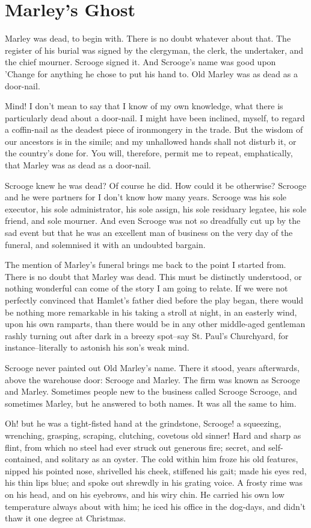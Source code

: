 \chapter{Marley's Ghost}

Marley was dead, to begin with. There is no doubt whatever about that.
The register of his burial was signed by the clergyman, the clerk, the
undertaker, and the chief mourner. Scrooge signed it. And Scrooge's name
was good upon 'Change for anything he chose to put his hand to. Old
Marley was as dead as a door-nail.

Mind! I don't mean to say that I know of my own knowledge, what there is
particularly dead about a door-nail. I might have been inclined, myself,
to regard a coffin-nail as the deadest piece of ironmongery in the
trade. But the wisdom of our ancestors is in the simile; and my
unhallowed hands shall not disturb it, or the country's done for. You
will, therefore, permit me to repeat, emphatically, that Marley was as
dead as a door-nail.

Scrooge knew he was dead? Of course he did. How could it be otherwise?
Scrooge and he were partners for I don't know how many years. Scrooge
was his sole executor, his sole administrator, his sole assign, his sole
residuary legatee, his sole friend, and sole mourner. And even Scrooge
was not so dreadfully cut up by the sad event but that he was an
excellent man of business on the very day of the funeral, and solemnised
it with an undoubted bargain.

The mention of Marley's funeral brings me back to the point I started
from. There is no doubt that Marley was dead. This must be distinctly
understood, or nothing wonderful can come of the story I am going to
relate. If we were not perfectly convinced that Hamlet's father died
before the play began, there would be nothing more remarkable in his
taking a stroll at night, in an easterly wind, upon his own ramparts,
than there would be in any other middle-aged gentleman rashly turning
out after dark in a breezy spot--say St. Paul's Churchyard, for
instance--literally to astonish his son's weak mind.

Scrooge never painted out Old Marley's name. There it stood, years
afterwards, above the warehouse door: Scrooge and Marley. The firm was
known as Scrooge and Marley. Sometimes people new to the business called
Scrooge Scrooge, and sometimes Marley, but he answered to both names. It
was all the same to him.

Oh! but he was a tight-fisted hand at the grindstone, Scrooge! a
squeezing, wrenching, grasping, scraping, clutching, covetous old
sinner! Hard and sharp as flint, from which no steel had ever struck out
generous fire; secret, and self-contained, and solitary as an oyster.
The cold within him froze his old features, nipped his pointed nose,
shrivelled his cheek, stiffened his gait; made his eyes red, his thin
lips blue; and spoke out shrewdly in his grating voice. A frosty rime
was on his head, and on his eyebrows, and his wiry chin. He carried his
own low temperature always about with him; he iced his office in the
dog-days, and didn't thaw it one degree at Christmas.

